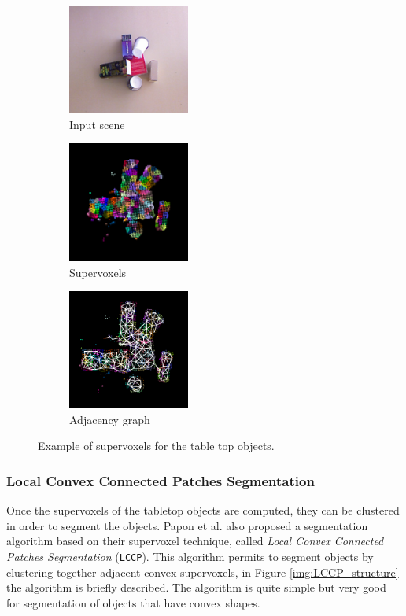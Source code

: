 \begin{figure}[tb]
\centering
\begin{subfigure}[t]{0.3\textwidth}
\centering
\includegraphics[width=4cm]{Img/ObjectSegmentation/seg1_rgb.png}
\caption{Input scene}
\end{subfigure}
\begin{subfigure}[t]{0.3\textwidth}
\centering
\includegraphics[width=4cm]{Img/ObjectSegmentation/voxel2.png}
\caption{Supervoxels}
\end{subfigure}
\begin{subfigure}[t]{0.3\textwidth}
\centering
\includegraphics[width=4cm]{Img/ObjectSegmentation/voxel1.png}
\caption{Adjacency graph}
\end{subfigure}
\caption{Example of supervoxels for the table top objects.}\label{fig:voxels_results}
\end{figure}

\subsubsection{Local Convex Connected Patches Segmentation}
\label{sec:LCCP}
Once the supervoxels of the tabletop objects are computed, they can be clustered in order to segment the objects. Papon et al. \citep{LCCP} also proposed a segmentation algorithm based on their supervoxel technique, called \textit{Local Convex Connected Patches Segmentation} (\texttt{LCCP}). This algorithm permits to segment objects by clustering together adjacent convex supervoxels, in Figure \ref{img:LCCP_structure} the algorithm is briefly described.   The algorithm is quite simple but very good for segmentation of objects that have convex shapes. 

